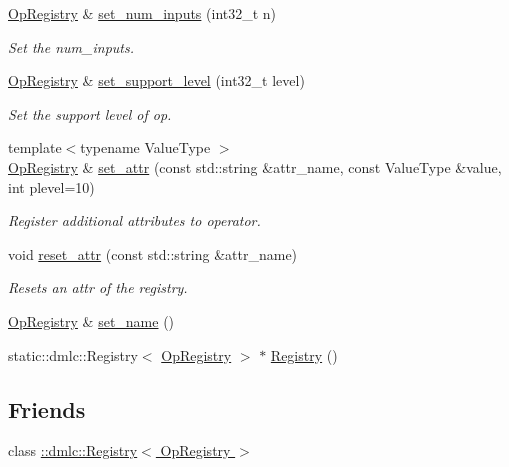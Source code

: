 \begin{DoxyCompactItemize}
\hyperlink{classtvm_1_1OpRegistry}{Op\+Registry} \& \hyperlink{classtvm_1_1OpRegistry_a432a240bf74af65004beee94d046edfd}{set\+\_\+num\+\_\+inputs} (int32\+\_\+t n)
\begin{DoxyCompactList}\small\item\em Set the num\+\_\+inputs. \end{DoxyCompactList}\item 
\hyperlink{classtvm_1_1OpRegistry}{Op\+Registry} \& \hyperlink{classtvm_1_1OpRegistry_adb43dc08f36cc080855bbec206b1c86f}{set\+\_\+support\+\_\+level} (int32\+\_\+t level)
\begin{DoxyCompactList}\small\item\em Set the support level of op. \end{DoxyCompactList}\item 
{\footnotesize template$<$typename Value\+Type $>$ }\\\hyperlink{classtvm_1_1OpRegistry}{Op\+Registry} \& \hyperlink{classtvm_1_1OpRegistry_a1fe827230a62fd815f63b9b6f0e2531b}{set\+\_\+attr} (const std\+::string \&attr\+\_\+name, const Value\+Type \&value, int plevel=10)
\begin{DoxyCompactList}\small\item\em Register additional attributes to operator. \end{DoxyCompactList}\item 
void \hyperlink{classtvm_1_1OpRegistry_ab48f7359fb391ebb154a13a87cb927bb}{reset\+\_\+attr} (const std\+::string \&attr\+\_\+name)
\begin{DoxyCompactList}\small\item\em Resets an attr of the registry. \end{DoxyCompactList}\item 
\hyperlink{classtvm_1_1OpRegistry}{Op\+Registry} \& \hyperlink{classtvm_1_1OpRegistry_a1b08766909281904cb0006682fc7b04e}{set\+\_\+name} ()
\item 
static\+::dmlc\+::\+Registry$<$ \hyperlink{classtvm_1_1OpRegistry}{Op\+Registry} $>$ $\ast$ \hyperlink{classtvm_1_1OpRegistry_ac0f9d63e659e4059fe46688363a0219e}{Registry} ()
\end{DoxyCompactItemize}
\subsection*{Friends}
\begin{DoxyCompactItemize}
\item 
class \hyperlink{classtvm_1_1OpRegistry_a956426f929f055cff95af38d41ed8085}{\+::dmlc\+::\+Registry$<$ Op\+Registry $>$}
\end{DoxyCompactItemize}


